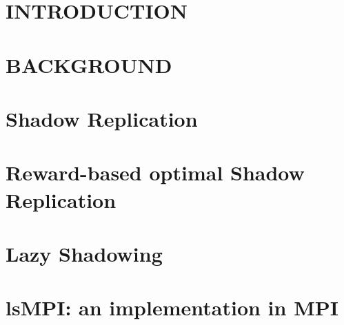 \documentclass[driverfallback=dvipdfmx,final]{pittetd}
\begin{document}


\tableofcontents
%
%
\chapter{INTRODUCTION}
\label{chapter:intro}


\chapter{BACKGROUND}
\label{chapter:background}


\chapter{Shadow Replication}
\label{chapter:shadowing}


\chapter{Reward-based optimal Shadow Replication}
\label{chapter:reward}


\chapter{Lazy Shadowing}
\label{chapter:scale}


\chapter{\texorpdfstring{\MakeLowercase{ls}MPI}{lsMPI}: an implementation in MPI}
\label{chapter:implementation}

\end{document}

